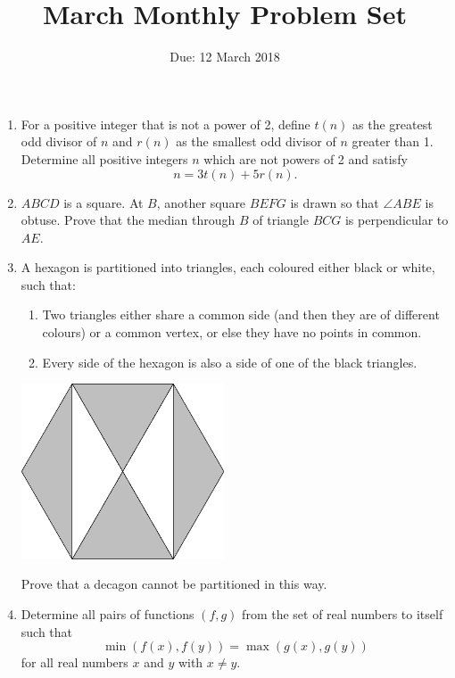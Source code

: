 \documentclass[12pt]{article}
\title{\vspace{-12pt}March Monthly Problem Set}
\author{Due: 12 March 2018}
\date{}
\begin{document}
 \maketitle \pagestyle{empty}

\begin{enumerate}

\item %
For a positive integer that is not a power of 2, define $t(n)$ as the greatest odd divisor of $n$ and $r(n)$ as the smallest odd divisor of $n$ greater than 1. Determine all positive integers $n$ which are not powers of 2 and satisfy
	\[ n = 3t(n)+5r(n).\]


\item %
$ABCD$ is a square. At $B$, another square $BEFG$ is drawn so that $\angle ABE$ is obtuse. Prove that the median through $B$ of triangle $BCG$ is perpendicular to $AE$.


\item %
A hexagon is partitioned into triangles, each coloured either black or white, such that:
\begin{enumerate}
\item Two triangles either share a common side (and then they are of different colours) or a common vertex, or else they have no points in common.
\item Every side of the hexagon is also a side of one of the black triangles.
\end{enumerate}

\begin{center}
    \includegraphics[width=6cm]{march_hexagon.eps}
\end{center}

Prove that a decagon cannot be partitioned in this way.


\item %
Determine all pairs of functions $(f,g)$ from the set of real numbers to itself such that
\[ \min(f(x),f(y)) = \max(g(x),g(y)) \]
for all real numbers $x$ and $y$ with $x \neq y$.



\end{enumerate}
\end{document}
